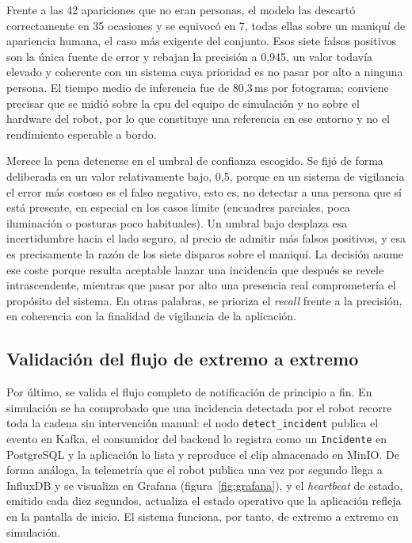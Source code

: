 Frente a las 42 apariciones que no eran personas, el modelo las descartó correctamente en 35
ocasiones y se equivocó en 7, todas ellas sobre un maniquí de apariencia humana, el caso más
exigente del conjunto. Esos siete falsos positivos son la única fuente de error y rebajan la
precisión a 0,945, un valor todavía elevado y coherente con un sistema cuya prioridad es no
pasar por alto a ninguna persona. El tiempo medio de inferencia fue de 80,3\,ms por fotograma;
conviene precisar que se midió sobre la \acrshort{cpu} del equipo de simulación y no sobre el
hardware del robot, por lo que constituye una referencia en ese entorno y no el rendimiento
esperable a bordo.

Merece la pena detenerse en el umbral de confianza escogido. Se fijó de forma deliberada en un
valor relativamente bajo, 0,5, porque en un sistema de vigilancia el error más costoso es el
falso negativo, esto es, no detectar a una persona que sí está presente, en especial en los
casos límite (encuadres parciales, poca iluminación o posturas poco habituales). Un umbral bajo
desplaza esa incertidumbre hacia el lado seguro, al precio de admitir más falsos positivos, y
esa es precisamente la razón de los siete disparos sobre el maniquí. La decisión asume ese coste
porque resulta aceptable lanzar una incidencia que después se revele intrascendente, mientras
que pasar por alto una presencia real comprometería el propósito del sistema. En otras palabras,
se prioriza el \textit{recall} frente a la precisión, en coherencia con la finalidad de
vigilancia de la aplicación.

\subsection{Validación del flujo de extremo a extremo}
\label{sec:resultados-e2e}

Por último, se valida el flujo completo de notificación de principio a fin. En simulación se ha
comprobado que una incidencia detectada por el robot recorre toda la cadena sin intervención
manual: el nodo \texttt{detect\_incident} publica el evento en Kafka, el consumidor del backend
lo registra como un \texttt{Incidente} en PostgreSQL y la aplicación lo lista y reproduce el
clip almacenado en MinIO. De forma análoga, la telemetría que el robot publica una vez por
segundo llega a InfluxDB y se visualiza en Grafana (figura~\ref{fig:grafana}), y el
\textit{heartbeat} de estado, emitido cada diez segundos, actualiza el estado operativo que la
aplicación refleja en la pantalla de inicio. El sistema funciona, por tanto, de extremo a
extremo en simulación.

